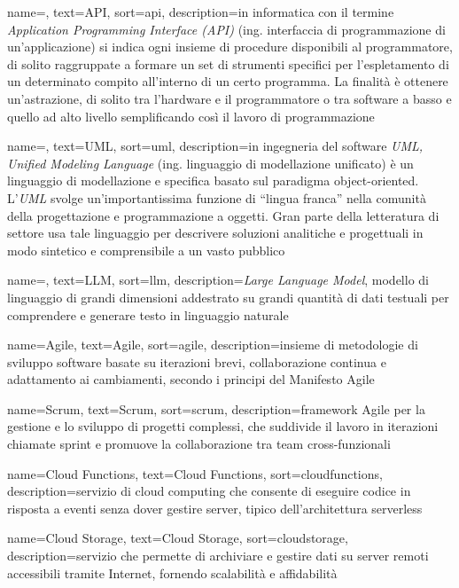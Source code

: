  {
    name=,
    text=API,
    sort=api,
    description={in informatica con il termine \emph{Application Programming Interface (API)} (ing. interfaccia di programmazione di un'applicazione) si indica ogni insieme di procedure disponibili al programmatore, di solito raggruppate a formare un set di strumenti specifici per l'espletamento di un determinato compito all'interno di un certo programma. La finalità è ottenere un'astrazione, di solito tra l'hardware e il programmatore o tra software a basso e quello ad alto livello semplificando così il lavoro di programmazione}
}

 {
    name=,
    text=UML,
    sort=uml,
    description={in ingegneria del software \emph{UML, Unified Modeling Language} (ing. linguaggio di modellazione unificato) è un linguaggio di modellazione e specifica basato sul paradigma object-oriented. L'\emph{UML} svolge un'importantissima funzione di ``lingua franca'' nella comunità della progettazione e programmazione a oggetti. Gran parte della letteratura di settore usa tale linguaggio per descrivere soluzioni analitiche e progettuali in modo sintetico e comprensibile a un vasto pubblico}
}

 {
    name=,
    text=LLM,
    sort=llm,
    description={\emph{Large Language Model}, modello di linguaggio di grandi dimensioni addestrato su grandi quantità di dati testuali per comprendere e generare testo in linguaggio naturale}
}

 {
    name=Agile,
    text=Agile,
    sort=agile,
    description={insieme di metodologie di sviluppo software basate su iterazioni brevi, collaborazione continua e adattamento ai cambiamenti, secondo i principi del Manifesto Agile}
}

 {
    name=Scrum,
    text=Scrum,
    sort=scrum,
    description={framework Agile per la gestione e lo sviluppo di progetti complessi, che suddivide il lavoro in iterazioni chiamate sprint e promuove la collaborazione tra team cross-funzionali}
}

 {
    name=Cloud Functions,
    text=Cloud Functions,
    sort=cloudfunctions,
    description={servizio di cloud computing che consente di eseguire codice in risposta a eventi senza dover gestire server, tipico dell'architettura serverless}
}

 {
    name=Cloud Storage,
    text=Cloud Storage,
    sort=cloudstorage,
    description={servizio che permette di archiviare e gestire dati su server remoti accessibili tramite Internet, fornendo scalabilità e affidabilità}
}

